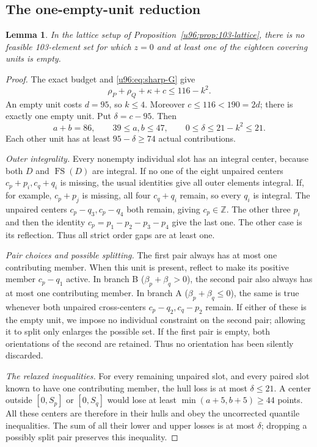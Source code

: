 \documentclass[11pt,a4paper]{article}
\newtheorem{lemma}[theorem]{Lemma}
\theoremstyle{remark}
\newcommand{\FS}{\operatorname{FS}}
\begin{document}
\subsection{The one-empty-unit reduction}
\begin{lemma}\label{u96:lem:one-empty}
In the lattice setup of Proposition~\ref{u96:prop:103-lattice}, there is no
feasible 103-element set for which $z=0$ and at least one of the eighteen
covering units is empty.
\end{lemma}
\begin{proof}
The exact budget and \eqref{u96:eq:sharp-G} give
\begin{equation}
 \rho_P+\rho_Q+\kappa+c\leq116-k^2.
 \label{u96:eq:103-zero-budget}
\end{equation}
An empty unit costs $d=95$, so $k\leq4$. Moreover $c\leq116<190=2d$;
there is exactly one empty unit. Put $\delta=c-95$. Then
\begin{equation}
 a+b=86,\qquad39\leq a,b\leq47,\qquad
 0\leq\delta\leq21-k^2\leq21.
 \label{u96:eq:one-empty-parameters}
\end{equation}
Each other unit has at least $95-\delta\geq74$ actual contributions.

\emph{Outer integrality.}
Every nonempty individual slot has an integral center, because both $D$
and $\FS(D)$ are integral. If no one of the eight unpaired centers
$c_p+p_i,c_q+q_i$ is missing, the usual identities give all outer elements
integral. If, for example, $c_p+p_j$ is missing, all four $c_q+q_i$ remain,
so every $q_i$ is integral. The unpaired centers $c_p-q_3,c_p-q_4$ both
remain, giving $c_p\in\mathbb Z$. The other three $p_i$ and then the
identity $c_p=p_1-p_2-p_3-p_4$ give the last one. The other case is its
reflection. Thus all strict order gaps are at least one.

\emph{Pair choices and possible splitting.}
The first pair always has at most one contributing member. When this unit
is present, reflect to make its positive member $c_p-q_1$ active.
In branch B ($\beta_p+\beta_q>0$), the second pair also always has at most
one contributing member. In branch A ($\beta_p+\beta_q\leq0$), the same
is true whenever both unpaired cross-centers $c_p-q_2,c_q-p_2$ remain.
If either of these is the empty unit, we impose no individual constraint
on the second pair; allowing it to split only enlarges the possible set.
If the first pair is empty, both orientations of the second are retained.
Thus no orientation has been silently discarded.

\emph{The relaxed inequalities.}
For every remaining unpaired slot, and every paired slot known to have
one contributing member, the hull loss is at most $\delta\leq21$.
A center outside $[0,S_p]$ or $[0,S_q]$ would lose at least
$\min(a+5,b+5)\geq44$ points. All these centers are therefore in their
hulls and obey the uncorrected quantile inequalities. The sum of all
their lower and upper losses is at most $\delta$; dropping a possibly
split pair preserves this inequality.


\end{proof}
\end{document}
